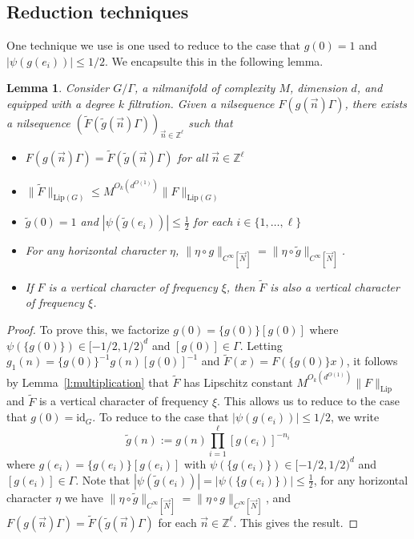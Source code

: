 \documentclass[11pt, a4paper]{amsart}
\theoremstyle{plain}
\theoremstyle{plain}
\newtheorem{lemma}{Lemma}
\theoremstyle{definition}
\theoremstyle{remark}
\numberwithin{equation}{section}
\numberwithin{lemma}{section}
\numberwithin{proposition}{section}
\numberwithin{corollary}{section}
\numberwithin{definition}{section}
\numberwithin{claim}{section}
\begin{document}
\subsection{Reduction techniques}
One technique we use is one used to reduce to the case that $g(0) = 1$ and $|\psi(g(e_i))| \le 1/2$. We encapsulte this in the following lemma.
\begin{lemma}\label{l:trick1}
Consider $G/\Gamma$, a nilmanifold of complexity $M$, dimension $d$, and equipped with a degree $k$ filtration. Given a nilsequence $F(g(\vec{n})\Gamma)$, there exists a nilsequence $(\tilde{F}(\tilde{g}(\vec{n})\Gamma))_{\vec{n} \in \mathbb{Z}^\ell}$ such that
\begin{itemize}
    \item $F(g(\vec{n})\Gamma) = \tilde{F}(\tilde{g}(\vec{n})\Gamma)$ for all $\vec{n} \in \mathbb{Z}^\ell$
    \item $\|\tilde{F}\|_{\mathrm{Lip}(G)} \le M^{O_k(d^{O(1)})}\|F\|_{\mathrm{Lip}(G)}$
    \item $\tilde{g}(0) = 1$ and $|\psi(\tilde{g}(e_i))| \le \frac{1}{2}$ for each $i \in \{1, \dots, \ell\}$
    \item For any horizontal character $\eta$, $\|\eta \circ g\|_{C^\infty[\vec{N}]} = \|\eta \circ \tilde{g}\|_{C^\infty[\vec{N}]}$. 
    \item If $F$ is a vertical character of frequency $\xi$, then $\tilde{F}$ is also a vertical character of frequency $\xi$.
\end{itemize}
\end{lemma}
\begin{proof}
To prove this, we factorize $g(0) = \{g(0)\} [g(0)]$ where $\psi(\{g(0)\}) \in [-1/2, 1/2)^d$ and $[g(0)] \in \Gamma$. Letting $g_1(n) = \{g(0)\}^{-1}g(n)[g(0)]^{-1}$ and $\tilde{F}(x) = F(\{g(0)\}x)$, it follows by Lemma~\ref{l:multiplication} that $\tilde{F}$ has Lipschitz constant $M^{O_k(d^{O(1)})}\|F\|_{\mathrm{Lip}}$ and $\tilde{F}$ is a vertical character of frequency $\xi$. This allows us to reduce to the case that $g(0) = \mathrm{id}_G$. To reduce to the case that $|\psi(g(e_i))| \le 1/2$, we write
$$\tilde{g}(n) := g(n) \prod_{i = 1}^\ell [g(e_i)]^{-n_i}$$
where $g(e_i) = \{g(e_i)\}[g(e_i)]$ with $\psi(\{g(e_i)\}) \in [-1/2, 1/2)^d$ and $[g(e_i)] \in \Gamma$. Note that $|\psi(\tilde{g}(e_i))| = |\psi(\{g(e_i)\})| \le \frac{1}{2}$, for any horizontal character $\eta$ we have $\|\eta \circ \tilde{g}\|_{C^\infty[\vec{N}]}= \|\eta \circ g\|_{C^\infty[\vec{N}]}$, and $F(g(\vec{n})\Gamma) = \tilde{F}(\tilde{g}(\vec{n})\Gamma)$ for each $\vec{n} \in \mathbb{Z}^\ell$. This gives the result.
\end{proof}
\end{document}
